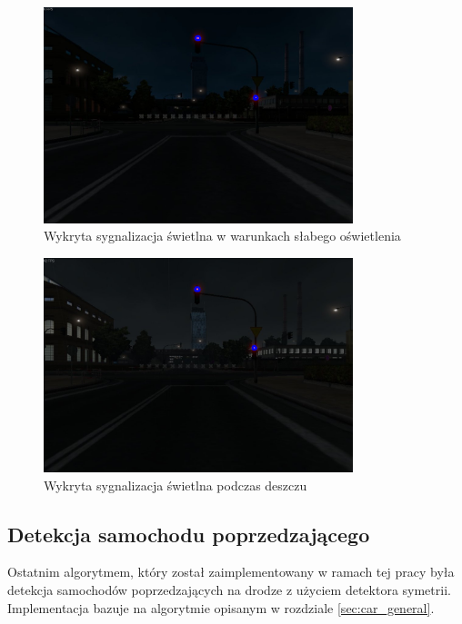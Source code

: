 \begin{figure}
  \centering
  \includegraphics[width=9cm]{img/alg2_late.jpg}
  \caption{Wykryta sygnalizacja świetlna w warunkach słabego oświetlenia}
  \label{fig:alg2_late}
\end{figure}

\begin{figure}
  \centering
  \includegraphics[width=9cm]{img/alg2_rain.jpg}
  \caption{Wykryta sygnalizacja świetlna podczas deszczu} 
  \label{fig:alg2_rain}
\end{figure}


\subsection{Detekcja samochodu poprzedzającego}
Ostatnim algorytmem, który został zaimplementowany w ramach tej pracy była detekcja samochodów poprzedzających na drodze z użyciem detektora symetrii. 
Implementacja bazuje na algorytmie opisanym w rozdziale \ref{sec:car_general}. 

